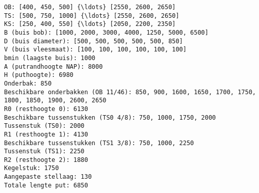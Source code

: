 \documentclass[11pt]{article}
\begin{document}
    \begin{Verbatim}[commandchars=\\\{\}]
OB: [400, 450, 500] {\ldots} [2550, 2600, 2650]
TS: [500, 750, 1000] {\ldots} [2550, 2600, 2650]
KS: [250, 400, 550] {\ldots} [2050, 2200, 2350]
B (buis bob): [1000, 2000, 3000, 4000, 1250, 5000, 6500]
D (buis diameter): [500, 500, 500, 500, 500, 850]
V (buis vleesmaat): [100, 100, 100, 100, 100, 100]
bmin (laagste buis): 1000
A (putrandhoogte NAP): 8000
H (puthoogte): 6980
Onderbak: 850
Beschikbare onderbakken (OB 11/46): 850, 900, 1600, 1650, 1700, 1750, 1800, 1850, 1900, 2600, 2650
R0 (resthoogte 0): 6130
Beschikbare tussenstukken (TS0 4/8): 750, 1000, 1750, 2000
Tussenstuk (TS0): 2000
R1 (resthoogte 1): 4130
Beschikbare tussenstukken (TS1 3/8): 750, 1000, 2250
Tussenstuk (TS1): 2250
R2 (resthoogte 2): 1880
Kegelstuk: 1750
Aangepaste stellaag: 130
Totale lengte put: 6850

    \end{Verbatim}


    
    
    
    
\end{document}
